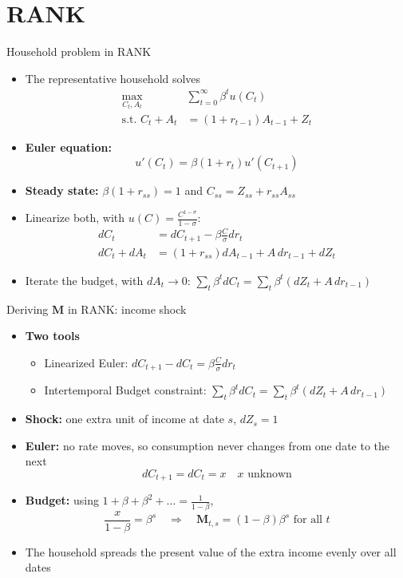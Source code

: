 \documentclass[10pt,english]{beamer}
\begin{document}
\section{RANK}

\begin{frame}{Household problem in RANK}
\begin{itemize}
\item <+->The representative household solves
\begin{align*}
\max_{C_{t},A_{t}} & \sum_{t=0}^{\infty}\beta^{t}u\left(C_{t}\right)\\
\text{s.t. }C_{t}+A_{t} & =\left(1+r_{t-1}\right)A_{t-1}+Z_{t}
\end{align*}
\item <+->\textbf{Euler equation:}
\[
u'\left(C_{t}\right)=\beta\left(1+r_{t}\right)u'\left(C_{t+1}\right)
\]
\item <+->\textbf{Steady state:} $\beta(1+r_{ss})=1$ and $C_{ss}=Z_{ss}+r_{ss}A_{ss}$
\item <+->Linearize both, with $u(C)=\frac{C^{1-\sigma}}{1-\sigma}$:
\begin{align*}
dC_{t} & =dC_{t+1}-\beta\frac{C}{\sigma}dr_{t}\\
dC_{t}+dA_{t} & =\left(1+r_{ss}\right)dA_{t-1}+A\,dr_{t-1}+dZ_{t}
\end{align*}
\item <+->Iterate the budget, with $dA_{t}\rightarrow0$: $\sum_{t}\beta^{t}dC_{t}=\sum_{t}\beta^{t}\left(dZ_{t}+A\,dr_{t-1}\right)$
\end{itemize}
\end{frame}
%
\begin{frame}{Deriving $\boldsymbol{M}$ in RANK: income shock}
\begin{itemize}
\item <+->\textbf{Two tools}
\begin{itemize}
\item Linearized Euler: $dC_{t+1}-dC_{t}=\beta\frac{C}{\sigma}dr_{t}$
\item Intertemporal Budget constraint: $\sum_{t}\beta^{t}dC_{t}=\sum_{t}\beta^{t}\left(dZ_{t}+A\,dr_{t-1}\right)$
\end{itemize}
\item <+->\textbf{Shock:} one extra unit of income at date $s$, $dZ_{s}=1$
\item <+->\textbf{Euler:} no rate moves, so consumption never changes from one date to the next
\[
dC_{t+1}=dC_{t}=x\quad x\text{ unknown}
\]
\item <+->\textbf{Budget:} using $1+\beta+\beta^{2}+\dots=\frac{1}{1-\beta}$,
\[
\frac{x}{1-\beta}=\beta^{s}\quad\Rightarrow\quad\boldsymbol{M}_{t,s}=(1-\beta)\beta^{s}\text{ for all }t
\]
\item <+->The household spreads the present value of the extra income evenly over all dates
\end{itemize}
\end{frame}
\end{document}
